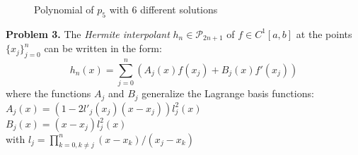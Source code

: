 \documentclass[14pt,a4paper]{article}
\begin{document}
\begin{enumerate}
\begin{figure}[htp]
			\caption{Polynomial of $p_5$ with 6 different solutions}
		\end{figure}
	\end{enumerate}
		
\large\textbf{Problem 3.} The \textit{Hermite interpolant} $h_n \in \mathcal{P}_{2n+1}$ of $f \in C^1[a,b]$ at the points $\{x_j\}_{j=0}^n$ can be written in the form: 
	\hspace*{3cm} $$h_n(x) = \sum_{j=0}^{n}(A_j(x)f(x_j) + B_j(x)f'(x_j))$$
	where the functions $A_j$ and $B_j$ generalize the Lagrange basis functions:\\
	\hspace*{3cm} $ A_j(x) = (1-2l'_j(x_j)(x - x_j))l_j^2(x)$ \\
	\hspace*{3cm} $ B_j(x) = (x - x_j)l_j^2(x)$ \\
	with $l_j = \prod_{k=0, k \neq j}^{n} (x-x_k)/(x_j-x_k) $
\end{document}

